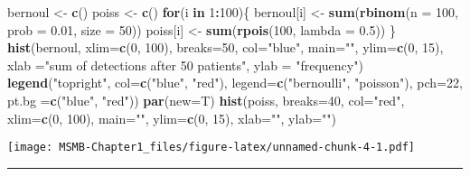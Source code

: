 \documentclass[]{article}
\newenvironment{Shaded}{\begin{snugshade}}{\end{snugshade}}
\newcommand{\KeywordTok}[1]{\textcolor[rgb]{0.13,0.29,0.53}{\textbf{#1}}}
\newcommand{\DataTypeTok}[1]{\textcolor[rgb]{0.13,0.29,0.53}{#1}}
\newcommand{\DecValTok}[1]{\textcolor[rgb]{0.00,0.00,0.81}{#1}}
\newcommand{\FloatTok}[1]{\textcolor[rgb]{0.00,0.00,0.81}{#1}}
\newcommand{\StringTok}[1]{\textcolor[rgb]{0.31,0.60,0.02}{#1}}
\newcommand{\ControlFlowTok}[1]{\textcolor[rgb]{0.13,0.29,0.53}{\textbf{#1}}}
\newcommand{\OperatorTok}[1]{\textcolor[rgb]{0.81,0.36,0.00}{\textbf{#1}}}
\newcommand{\NormalTok}[1]{#1}
\let\oldrule=\rule
\renewcommand{\rule}[1]{\oldrule{\linewidth}}
\begin{document}
\begin{Shaded}
\begin{Highlighting}[]
\NormalTok{bernoul <-}\StringTok{ }\KeywordTok{c}\NormalTok{()}
\NormalTok{poiss <-}\StringTok{ }\KeywordTok{c}\NormalTok{()}
\ControlFlowTok{for}\NormalTok{(i }\ControlFlowTok{in} \DecValTok{1}\OperatorTok{:}\DecValTok{100}\NormalTok{)\{}
\NormalTok{  bernoul[i] <-}\StringTok{ }\KeywordTok{sum}\NormalTok{(}\KeywordTok{rbinom}\NormalTok{(}\DataTypeTok{n =} \DecValTok{100}\NormalTok{, }\DataTypeTok{prob =} \FloatTok{0.01}\NormalTok{, }\DataTypeTok{size =} \DecValTok{50}\NormalTok{))}
\NormalTok{  poiss[i] <-}\StringTok{ }\KeywordTok{sum}\NormalTok{(}\KeywordTok{rpois}\NormalTok{(}\DecValTok{100}\NormalTok{, }\DataTypeTok{lambda =} \FloatTok{0.5}\NormalTok{))}
\NormalTok{\}}
\KeywordTok{hist}\NormalTok{(bernoul, }\DataTypeTok{xlim=}\KeywordTok{c}\NormalTok{(}\DecValTok{0}\NormalTok{, }\DecValTok{100}\NormalTok{), }\DataTypeTok{breaks=}\DecValTok{50}\NormalTok{, }\DataTypeTok{col=}\StringTok{"blue"}\NormalTok{, }\DataTypeTok{main=}\StringTok{""}\NormalTok{, }\DataTypeTok{ylim=}\KeywordTok{c}\NormalTok{(}\DecValTok{0}\NormalTok{, }\DecValTok{15}\NormalTok{), }\DataTypeTok{xlab =}\StringTok{"sum of detections after 50 patients"}\NormalTok{, }\DataTypeTok{ylab =} \StringTok{"frequency"}\NormalTok{)}
\KeywordTok{legend}\NormalTok{(}\StringTok{"topright"}\NormalTok{, }\DataTypeTok{col=}\KeywordTok{c}\NormalTok{(}\StringTok{"blue"}\NormalTok{, }\StringTok{"red"}\NormalTok{), }\DataTypeTok{legend=}\KeywordTok{c}\NormalTok{(}\StringTok{"bernoulli"}\NormalTok{, }\StringTok{"poisson"}\NormalTok{), }\DataTypeTok{pch=}\DecValTok{22}\NormalTok{, }\DataTypeTok{pt.bg =}\KeywordTok{c}\NormalTok{(}\StringTok{"blue"}\NormalTok{, }\StringTok{"red"}\NormalTok{))}
\KeywordTok{par}\NormalTok{(}\DataTypeTok{new=}\NormalTok{T)}
\KeywordTok{hist}\NormalTok{(poiss, }\DataTypeTok{breaks=}\DecValTok{40}\NormalTok{, }\DataTypeTok{col=}\StringTok{"red"}\NormalTok{, }\DataTypeTok{xlim=}\KeywordTok{c}\NormalTok{(}\DecValTok{0}\NormalTok{, }\DecValTok{100}\NormalTok{), }\DataTypeTok{main=}\StringTok{""}\NormalTok{, }\DataTypeTok{ylim=}\KeywordTok{c}\NormalTok{(}\DecValTok{0}\NormalTok{, }\DecValTok{15}\NormalTok{), }\DataTypeTok{xlab=}\StringTok{""}\NormalTok{, }\DataTypeTok{ylab=}\StringTok{""}\NormalTok{)}
\end{Highlighting}
\end{Shaded}

\texttt{[image: MSMB-Chapter1\_files/figure-latex/unnamed-chunk-4-1.pdf]}

\begin{center}\rule{0.5\linewidth}{\linethickness}\end{center}
\end{document}

